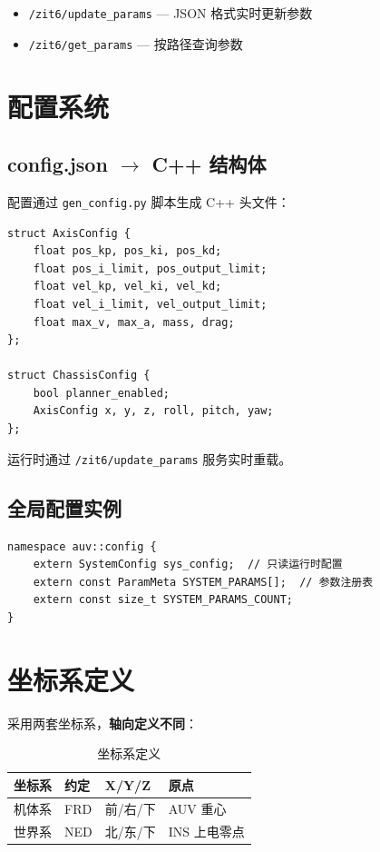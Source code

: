 \documentclass[12pt,a4paper]{article}
\begin{document}
\begin{itemize}
    \item \texttt{/zit6/update\_params} — JSON 格式实时更新参数
    \item \texttt{/zit6/get\_params} — 按路径查询参数
\end{itemize}

\section{配置系统}

\subsection{config.json $\rightarrow$ C++ 结构体}

配置通过 \texttt{gen\_config.py} 脚本生成 C++ 头文件：

\begin{lstlisting}[caption={配置结构体示例}]
struct AxisConfig {
    float pos_kp, pos_ki, pos_kd;
    float pos_i_limit, pos_output_limit;
    float vel_kp, vel_ki, vel_kd;
    float vel_i_limit, vel_output_limit;
    float max_v, max_a, mass, drag;
};

struct ChassisConfig {
    bool planner_enabled;
    AxisConfig x, y, z, roll, pitch, yaw;
};
\end{lstlisting}

运行时通过 \texttt{/zit6/update\_params} 服务实时重载。

\subsection{全局配置实例}

\begin{lstlisting}[caption={全局配置访问}]
namespace auv::config {
    extern SystemConfig sys_config;  // 只读运行时配置
    extern const ParamMeta SYSTEM_PARAMS[];  // 参数注册表
    extern const size_t SYSTEM_PARAMS_COUNT;
}
\end{lstlisting}

\section{坐标系定义}

采用两套坐标系，\textbf{轴向定义不同}：

\begin{table}[H]
\centering
\begin{tabularx}{\textwidth}{llll}
\toprule
\textbf{坐标系} & \textbf{约定} & \textbf{X/Y/Z} & \textbf{原点} \\
\midrule
机体系 & FRD & 前/右/下 & AUV 重心 \\
世界系 & NED & 北/东/下 & INS 上电零点 \\
\bottomrule
\end{tabularx}
\caption{坐标系定义}
\end{table}
\end{document}
